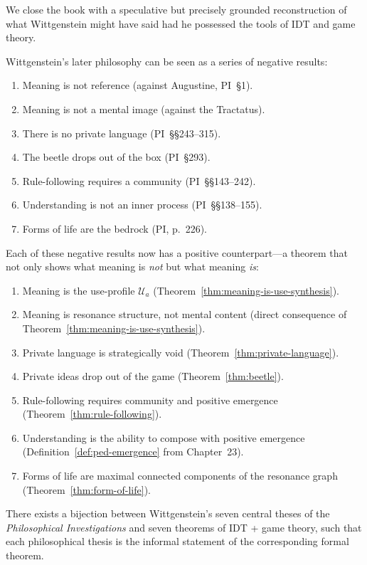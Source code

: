 We close the book with a speculative but precisely grounded
reconstruction of what Wittgenstein might have said had he
possessed the tools of IDT and game theory.

\begin{aside}
\label{aside:programme}
Wittgenstein's later philosophy can be seen as a series of
negative results:
\begin{enumerate}
  \item Meaning is not reference (against Augustine, PI~\S1).
  \item Meaning is not a mental image (against the Tractatus).
  \item There is no private language (PI~\S\S243--315).
  \item The beetle drops out of the box (PI~\S293).
  \item Rule-following requires a community (PI~\S\S143--242).
  \item Understanding is not an inner process (PI~\S\S138--155).
  \item Forms of life are the bedrock (PI, p.~226).
\end{enumerate}
Each of these negative results now has a positive counterpart---a
theorem that not only shows what meaning is \emph{not} but what
meaning \emph{is}:
\begin{enumerate}
  \item Meaning is the use-profile $\mathcal{U}_a$
    (Theorem~\ref{thm:meaning-is-use-synthesis}).
  \item Meaning is resonance structure, not mental content
    (direct consequence of Theorem~\ref{thm:meaning-is-use-synthesis}).
  \item Private language is strategically void
    (Theorem~\ref{thm:private-language}).
  \item Private ideas drop out of the game
    (Theorem~\ref{thm:beetle}).
  \item Rule-following requires community and positive emergence
    (Theorem~\ref{thm:rule-following}).
  \item Understanding is the ability to compose with positive
    emergence (Definition~\ref{def:ped-emergence} from Chapter~23).
  \item Forms of life are maximal connected components of the
    resonance graph (Theorem~\ref{thm:form-of-life}).
\end{enumerate}
\end{aside}

\begin{theorem}
\label{thm:wittgenstein-correspondence}
There exists a bijection between Wittgenstein's seven central
theses of the \textit{Philosophical Investigations} and seven
theorems of IDT + game theory, such that each philosophical
thesis is the informal statement of the corresponding formal
theorem.
\end{theorem}

